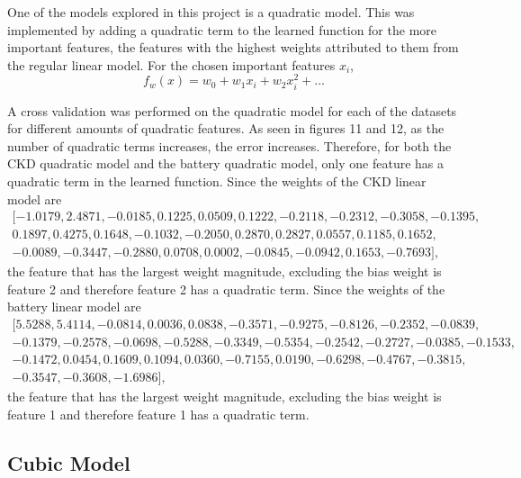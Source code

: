 \documentclass{article}
\begin{document}
One of the models explored in this project is a quadratic model.  This was implemented by adding a quadratic term to the learned function for the more important features, the features with the highest weights attributed to them from the regular linear model.  For the chosen important features $x_i$, 
\begin{equation}
   f_w(x) = w_0 + w_1 x_i + w_2 x_i^2 + \dots
\end{equation}

A cross validation was performed on the quadratic model for each of the datasets for different amounts of quadratic features.  As seen in figures 11 and 12, 
as the number of quadratic terms increases, the error increases.  Therefore, for both the CKD quadratic model and the battery quadratic model, only one feature has a quadratic term in the learned function.   
Since the weights of the CKD linear model are 
\begin{equation*}
  \begin{aligned}
    [-1.0179,  2.4871, -0.0185,  0.1225, 0.0509,  0.1222, -0.2118, -0.2312, -0.3058, -0.1395, \\
    0.1897,  0.4275,  0.1648, -0.1032, -0.2050,  0.2870,  0.2827,  0.0557, 0.1185,  0.1652, \\
    -0.0089, -0.3447, -0.2880,  0.0708, 0.0002, -0.0845, -0.0942,  0.1653, -0.7693],
  \end{aligned}
\end{equation*}
the feature that has the largest weight magnitude, excluding  the bias weight is feature 2 and therefore feature 2 has a quadratic term.   
Since the weights of the battery linear model are 
\begin{equation*}
  \begin{aligned}
    [5.5288, 5.4114, -0.0814, 0.0036, 0.0838, -0.3571, -0.9275, -0.8126, -0.2352, -0.0839, \\
    -0.1379, -0.2578, -0.0698, -0.5288, -0.3349, -0.5354, -0.2542, -0.2727, -0.0385, -0.1533, \\
    -0.1472, 0.0454, 0.1609, 0.1094, 0.0360, -0.7155, 0.0190, -0.6298, -0.4767, -0.3815, \\
    -0.3547, -0.3608, -1.6986],
  \end{aligned}
  \end{equation*}
the feature that has the largest weight magnitude, excluding the bias weight is feature 1 and therefore feature 1 has a quadratic term. 

\subsection{Cubic Model}
\end{document}
